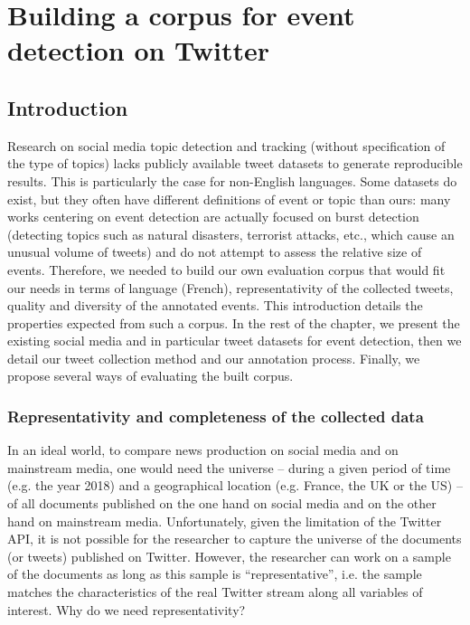 \chapter{Building a corpus for event detection on Twitter}
\label{Chapter: Corpus}

\section{Introduction}

Research on social media topic detection and tracking (without specification
of the type of topics) lacks publicly available tweet
datasets to generate reproducible results. This is particularly the case for non-English languages. Some datasets do exist, but they often have different definitions of event or topic than ours: many works centering on event detection are actually focused on burst detection (detecting topics such as natural disasters, terrorist attacks, etc., which cause an unusual volume of tweets) and do not attempt to assess the relative size of events. 
Therefore, we needed to build our own evaluation corpus that would fit our needs in terms of language (French), representativity of the collected tweets, quality and diversity of the annotated events. This introduction details the properties expected from such a corpus. In the rest of the chapter, we present the existing social media and in particular tweet datasets for event detection, then we detail our tweet collection method and our annotation process. Finally, we propose several ways of evaluating the built corpus.

\subsection{Representativity and completeness of the collected data}
In an ideal world, to compare news production on social media and on mainstream media, one would need the
universe – during a given period of time (e.g. the year 2018) and a geographical location (e.g. France, the UK or
the US) – of all documents published on the one hand on social media and on the other hand on mainstream media.
Unfortunately, given the limitation of the Twitter API, it is not possible for the researcher to capture the universe
of the documents (or tweets) published on Twitter. However, the researcher can work on a sample of the documents
as long as this sample is ``representative”, i.e. the sample matches the characteristics of the real Twitter stream along all variables of interest.
Why do we need representativity?


